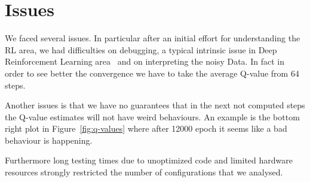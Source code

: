 
\section{Issues}

We faced several issues. In particular after an initial effort for understanding the RL area, we had difficulties on debugging, a typical intrinsic issue in Deep Reinforcement Learning area~\cite{rlblogpost} and on interpreting the noisy Data. In fact in order to see better the convergence we have to take the average Q-value from 64 steps.

Another issues is that we have no guarantees that in the next not computed steps the Q-value estimates will not have weird behaviours. An example is the bottom right plot in Figure~\ref{fig:q-values} where after 12000 epoch it seems like a bad behaviour is happening.

Furthermore long testing times due to unoptimized code and limited hardware resources strongly restricted the number of configurations that we analysed.

